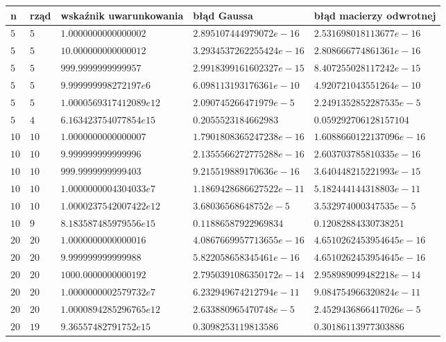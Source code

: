\documentclass{article}
\begin{document}
\begin{center}
	\begin{tabular}{|p{1cm}|p{1cm}|p{4cm}|p{4cm}|p{4cm}|} \hline
		\textbf{n} & \textbf{rząd} & \textbf{wskaźnik \newline uwarunkowania} & \textbf{błąd Gaussa} & \textbf{błąd macierzy \newline odwrotnej}  \\
		\hline
		$5$ & $5$ & $1.0000000000000002$ & $2.895107444979072e-16$ & $2.531698018113677e-16$  \\
		\hline
		$5$ & $5$ & $10.000000000000012$ & $3.2934537262255424e-16$ & $2.808666774861361e-16$  \\
		\hline
		$5$ & $5$ & $999.9999999999957$ & $2.9918399161602327e-15$ & $8.407255028117242e-15$  \\
		\hline
		$5$ & $5$ & $9.999999998272197e6$ & $6.098113193176361e-10$ & $4.920721043551264e-10$  \\
		\hline
		$5$ & $5$ & $1.0000569317412089e12$ & $2.090745266471979e-5$ & $2.2491352852287535e-5$  \\
		\hline
		$5$ & $4$ & $6.163423754077854e15$ & $0.2055523184662983$ & $0.059292706128157104$  \\
		\hline
		$10$ & $10$ & $1.0000000000000007$ & $1.7901808365247238e-16$ & $1.6088660122137096e-16$  \\
		\hline
		$10$ & $10$ & $9.999999999999996$ & $2.1355566272775288e-16$ & $2.603703785810335e-16$  \\
		\hline
		$10$ & $10$ & $999.9999999999403$ & $9.215519889170636e-16$ & $3.640448215221993e-15$  \\
		\hline
		$10$ & $10$ & $1.0000000004304033e7$ & $1.1869428686627522e-11$ & $5.182444144318803e-11$  \\
		\hline
		$10$ & $10$ & $1.0000237542007422e12$ & $3.68036568648752e-5$ & $3.532974000347535e-5$  \\
		\hline
		$10$ & $9$ & $8.183587485979556e15$ & $0.11886587922969834$ & $0.12082884330738251$  \\
		\hline
		$20$ & $20$ & $1.0000000000000016$ & $4.0867669957713655e-16$ & $4.6510262453954645e-16$  \\
		\hline
		$20$ & $20$ & $9.999999999999988$ & $5.822058658345461e-16$ & $4.6510262453954645e-16$  \\
		\hline
		$20$ & $20$ & $1000.0000000000192$ & $2.7950391086350172e-14$ & $2.958989099482218e-14$  \\
		\hline
		$20$ & $20$ & $1.0000000002579732e7$ & $6.232949674212794e-11$ & $9.084754966320824e-11$  \\
		\hline
		$20$ & $20$ & $1.0000894285296765e12$ & $2.633880965470748e-5$ & $2.4529436866417026e-5$  \\
		\hline
		$20$ & $19$ & $9.36557482791752e15$ & $0.3098253119813586$ & $0.30186113977303886$  \\
		\hline
	\end{tabular}
\end{center}
\end{document}
